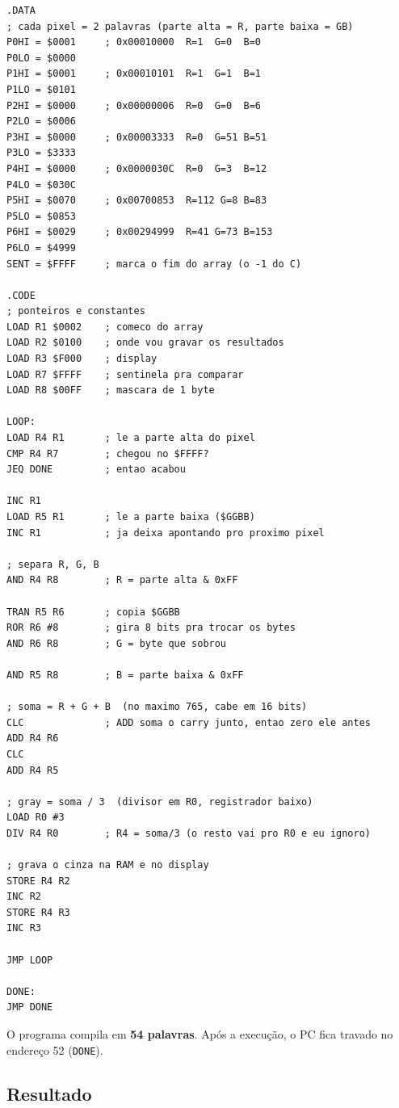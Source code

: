 \documentclass[12pt, a4paper]{article}
\begin{document}
\begin{lstlisting}[style=asm, caption={ex2.s --- versão final em Excel-ASM16}]
.DATA
; cada pixel = 2 palavras (parte alta = R, parte baixa = GB)
P0HI = $0001     ; 0x00010000  R=1  G=0  B=0
P0LO = $0000
P1HI = $0001     ; 0x00010101  R=1  G=1  B=1
P1LO = $0101
P2HI = $0000     ; 0x00000006  R=0  G=0  B=6
P2LO = $0006
P3HI = $0000     ; 0x00003333  R=0  G=51 B=51
P3LO = $3333
P4HI = $0000     ; 0x0000030C  R=0  G=3  B=12
P4LO = $030C
P5HI = $0070     ; 0x00700853  R=112 G=8 B=83
P5LO = $0853
P6HI = $0029     ; 0x00294999  R=41 G=73 B=153
P6LO = $4999
SENT = $FFFF     ; marca o fim do array (o -1 do C)

.CODE
; ponteiros e constantes
LOAD R1 $0002    ; comeco do array
LOAD R2 $0100    ; onde vou gravar os resultados
LOAD R3 $F000    ; display
LOAD R7 $FFFF    ; sentinela pra comparar
LOAD R8 $00FF    ; mascara de 1 byte

LOOP:
LOAD R4 R1       ; le a parte alta do pixel
CMP R4 R7        ; chegou no $FFFF?
JEQ DONE         ; entao acabou

INC R1
LOAD R5 R1       ; le a parte baixa ($GGBB)
INC R1           ; ja deixa apontando pro proximo pixel

; separa R, G, B
AND R4 R8        ; R = parte alta & 0xFF

TRAN R5 R6       ; copia $GGBB
ROR R6 #8        ; gira 8 bits pra trocar os bytes
AND R6 R8        ; G = byte que sobrou

AND R5 R8        ; B = parte baixa & 0xFF

; soma = R + G + B  (no maximo 765, cabe em 16 bits)
CLC              ; ADD soma o carry junto, entao zero ele antes
ADD R4 R6
CLC
ADD R4 R5

; gray = soma / 3  (divisor em R0, registrador baixo)
LOAD R0 #3
DIV R4 R0        ; R4 = soma/3 (o resto vai pro R0 e eu ignoro)

; grava o cinza na RAM e no display
STORE R4 R2
INC R2
STORE R4 R3
INC R3

JMP LOOP

DONE:
JMP DONE
\end{lstlisting}

O programa compila em \textbf{54 palavras}. Após a execução, o PC fica travado no endereço 52 (\texttt{DONE}).

\subsection{Resultado}
\end{document}
